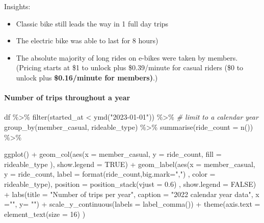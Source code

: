 \documentclass[
]{article}
\newenvironment{Shaded}{\begin{snugshade}}{\end{snugshade}}
\newcommand{\AttributeTok}[1]{\textcolor[rgb]{0.77,0.63,0.00}{#1}}
\newcommand{\CommentTok}[1]{\textcolor[rgb]{0.56,0.35,0.01}{\textit{#1}}}
\newcommand{\ConstantTok}[1]{\textcolor[rgb]{0.00,0.00,0.00}{#1}}
\newcommand{\DecValTok}[1]{\textcolor[rgb]{0.00,0.00,0.81}{#1}}
\newcommand{\FloatTok}[1]{\textcolor[rgb]{0.00,0.00,0.81}{#1}}
\newcommand{\FunctionTok}[1]{\textcolor[rgb]{0.00,0.00,0.00}{#1}}
\newcommand{\NormalTok}[1]{#1}
\newcommand{\SpecialCharTok}[1]{\textcolor[rgb]{0.00,0.00,0.00}{#1}}
\newcommand{\StringTok}[1]{\textcolor[rgb]{0.31,0.60,0.02}{#1}}
\begin{document}
Insights:

\begin{itemize}
\item
  Classic bike still leads the way in 1 full day trips
\item
  The electric bike was able to last for 8 hours)
\item
  The absolute majority of long rides on e-bikes were taken by members.
  (Pricing starts at \$1 to unlock plus \$0.39/minute for casual riders
  (\$0 to unlock plus \textbf{\$0.16/minute for members)}.)
\end{itemize}

\hypertarget{number-of-trips-throughout-a-year}{%
\paragraph{Number of trips throughout a
year}\label{number-of-trips-throughout-a-year}}

\begin{Shaded}
\begin{Highlighting}[]
\NormalTok{df }\SpecialCharTok{\%\textgreater{}\%} 
  \FunctionTok{filter}\NormalTok{(started\_at }\SpecialCharTok{\textless{}} \FunctionTok{ymd}\NormalTok{(}\StringTok{"2023{-}01{-}01"}\NormalTok{)) }\SpecialCharTok{\%\textgreater{}\%} \CommentTok{\# limit to a calendar year  }
  \FunctionTok{group\_by}\NormalTok{(member\_casual, rideable\_type) }\SpecialCharTok{\%\textgreater{}\%} 
  \FunctionTok{summarise}\NormalTok{(}\AttributeTok{ride\_count =} \FunctionTok{n}\NormalTok{()) }\SpecialCharTok{\%\textgreater{}\%}
  
  \FunctionTok{ggplot}\NormalTok{() }\SpecialCharTok{+} 
  \FunctionTok{geom\_col}\NormalTok{(}\FunctionTok{aes}\NormalTok{(}\AttributeTok{x =}\NormalTok{ member\_casual, }\AttributeTok{y =}\NormalTok{ ride\_count,  }\AttributeTok{fill =}\NormalTok{ rideable\_type ),}
           \AttributeTok{show.legend =} \ConstantTok{TRUE}\NormalTok{) }\SpecialCharTok{+} 
  \FunctionTok{geom\_label}\NormalTok{(}\FunctionTok{aes}\NormalTok{(}\AttributeTok{x =}\NormalTok{ member\_casual, }\AttributeTok{y =}\NormalTok{ ride\_count,  }
                 \AttributeTok{label =} \FunctionTok{format}\NormalTok{(ride\_count,}\AttributeTok{big.mark=}\StringTok{","}\NormalTok{) , }\AttributeTok{color =}\NormalTok{ rideable\_type),}
             \AttributeTok{position =} \FunctionTok{position\_stack}\NormalTok{(}\AttributeTok{vjust =} \FloatTok{0.6}\NormalTok{) , }\AttributeTok{show.legend =} \ConstantTok{FALSE}\NormalTok{) }\SpecialCharTok{+} 
  \FunctionTok{labs}\NormalTok{(}\AttributeTok{title =} \StringTok{"Number of trips per year"}\NormalTok{, }
       \AttributeTok{caption =} \StringTok{"2022 calendar year data"}\NormalTok{,}
       \AttributeTok{x =}\StringTok{""}\NormalTok{, }\AttributeTok{y=} \StringTok{""}\NormalTok{) }\SpecialCharTok{+}  
  \FunctionTok{scale\_y\_continuous}\NormalTok{(}\AttributeTok{labels =} \FunctionTok{label\_comma}\NormalTok{()) }\SpecialCharTok{+}
  \FunctionTok{theme}\NormalTok{(}\AttributeTok{axis.text =} \FunctionTok{element\_text}\NormalTok{(}\AttributeTok{size =} \DecValTok{16}\NormalTok{) ) }
\end{Highlighting}
\end{Shaded}
\end{document}
